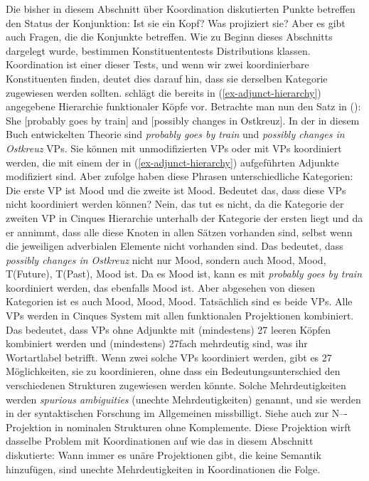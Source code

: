 Die bisher in diesem Abschnitt über Koordination diskutierten Punkte betreffen den Status der
Konjunktion: Ist sie ein Kopf? Was projiziert sie? Aber es gibt auch Fragen, die die Konjunkte
betreffen. Wie zu Beginn dieses Abschnitts dargelegt wurde, bestimmen Konstituententests Distributions%
klassen. Koordination ist einer dieser Tests, und wenn wir zwei koordinierbare Konstituenten finden, deutet dies
darauf hin, dass sie derselben Kategorie zugewiesen werden sollten.
\citet[]{Cinque99a-u} schlägt die bereits in (\ref{ex-adjunct-hierarchy}) angegebene Hierarchie funktionaler Köpfe vor.
Betrachte man nun den Satz in ():
\ea
She [probably goes by train] and [possibly changes in Ostkreuz].
\z
In der in diesem Buch entwickelten Theorie sind \emph{probably goes by train} und \emph{possibly changes in
  Ostkreuz} VPs. Sie können mit unmodifizierten VPs oder mit VPs koordiniert werden, die mit einem der
in (\ref{ex-adjunct-hierarchy}) aufgeführten Adjunkte modifiziert sind. Aber \citeauthor{Cinque99a-u} zufolge haben diese Phrasen
unterschiedliche Kategorien: Die erste VP ist Mood und die zweite ist
Mood. Bedeutet das, dass diese VPs nicht koordiniert werden können? Nein, das tut es nicht, da die
Kategorie der zweiten VP in Cinques Hierarchie unterhalb der Kategorie der ersten liegt und da er
annimmt, dass alle diese Knoten in allen Sätzen vorhanden sind, selbst wenn die jeweiligen adverbialen Elemente
nicht vorhanden sind. Das bedeutet, dass \emph{possibly changes in Ostkreuz} nicht nur
Mood, sondern auch Mood, Mood, T(Future), T(Past),
Mood ist. Da es Mood ist, kann es mit \emph{probably goes
  by train} koordiniert werden, das ebenfalls Mood ist. Aber abgesehen von diesen Kategorien ist es auch
Mood, Mood, Mood. Tatsächlich sind es beide VPs. Alle VPs werden
in Cinques System mit allen funktionalen Projektionen kombiniert. Das bedeutet, dass VPs ohne Adjunkte
mit (mindestens) 27 leeren Köpfen kombiniert werden und (mindestens) 27fach mehrdeutig sind, was ihr
Wortartlabel betrifft. Wenn zwei solche VPs
koordiniert werden, gibt es 27 Möglichkeiten, sie zu koordinieren, ohne dass ein Bedeutungsunterschied den
verschiedenen Strukturen zugewiesen werden könnte. Solche Mehrdeutigkeiten werden \emph{spurious ambiguities} (unechte Mehrdeutigkeiten) genannt, und
sie werden in der syntaktischen Forschung im Allgemeinen missbilligt. Siehe auch  zur
N--\nbar-Projektion in nominalen Strukturen ohne Komplemente. Diese Projektion wirft dasselbe Problem
mit Koordinationen auf wie das in diesem Abschnitt diskutierte: Wann immer es unäre Projektionen
gibt, die keine Semantik hinzufügen, sind unechte Mehrdeutigkeiten in Koordinationen die Folge.%

